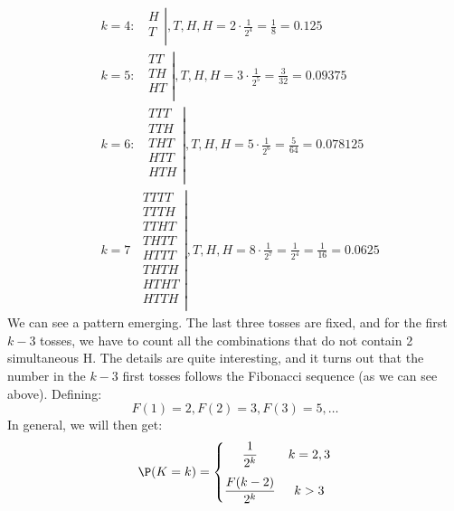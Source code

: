 \newpage\noindent
\begin{align*}
    &k=4:\;\;
    \left.
    \begin{matrix} 
        H \\ 
        T \\ 
    \end{matrix}
    \right|,T, H, H
    = 2\cdot \frac{1}{2^4} = \frac{1}{8} = 0.125\\
    &k=5:\;\;
    \left.
    \begin{matrix} 
        TT \\ 
        TH \\ 
        HT \\ 
    \end{matrix}
    \right|,T, H, H
    = 3\cdot \frac{1}{2^5} = \frac{3}{32} = 0.09375\\
    &k=6:\;\;
    \left.
    \begin{matrix} 
        TTT \\ 
        TTH \\ 
        THT \\ 
        HTT \\ 
        HTH \\ 
    \end{matrix}
    \right|,T, H, H
    = 5\cdot \frac{1}{2^6} = \frac{5}{64} = 0.078125 \\
    &k=7\;\;
    \left.
    \begin{matrix} 
        TTTT \\ 
        TTTH \\ 
        TTHT \\ 
        THTT \\ 
        HTTT \\ 
        THTH \\ 
        HTHT \\ 
        HTTH \\ 
    \end{matrix}
    \right|,T, H, H
    = 8\cdot \frac{1}{2^7} = \frac{1}{2^4} = \frac{1}{16} = 0.0625
\end{align*}
We can see a pattern emerging. The last three tosses are fixed, and for the first $k-3$ tosses, we have to count
all the combinations that do not contain 2 simultaneous H. The details are quite interesting, and it turns out
that the number in the $k-3$ first tosses follows the Fibonacci sequence (as we can see above). Defining:
$$
F(1) = 2, F(2) = 3, F(3) = 5, \ldots
$$
In general, we will then get:
$$
\P(K=k) =
\left\{
    \begin{matrix}
        \displaystyle\frac{1}{2^k} & k = 2,3 \\
        \rule{0pt}{22pt}\displaystyle\frac{F(k-2)}{2^k} & k > 3
    \end{matrix}
\right.
$$


